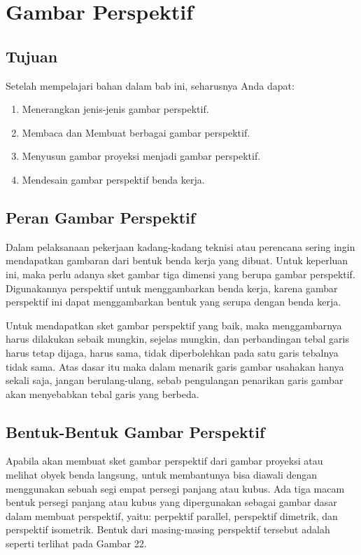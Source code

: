 \documentclass[11pt]{simart} %
\begin{document}
\section{Gambar Perspektif}

\subsection*{Tujuan}
Setelah mempelajari bahan dalam bab ini, seharusnya Anda dapat:
\begin{enumerate}
	\item Menerangkan jenis-jenis gambar perspektif.
	\item Membaca dan Membuat berbagai gambar perspektif.
	\item Menyusun gambar proyeksi menjadi gambar perspektif.
	\item Mendesain gambar perspektif benda kerja.
\end{enumerate}

\subsection{Peran Gambar Perspektif}
Dalam pelaksanaan pekerjaan kadang-kadang teknisi atau perencana sering ingin mendapatkan gambaran dari bentuk benda kerja yang dibuat. Untuk keperluan ini, maka perlu adanya sket gambar tiga dimensi yang berupa gambar perspektif. Digunakannya perspektif untuk menggambarkan benda kerja, karena gambar perspektif ini dapat menggambarkan bentuk yang serupa dengan benda kerja.

Untuk mendapatkan sket gambar perspektif yang baik, maka menggambarnya harus dilakukan sebaik mungkin, sejelas mungkin, dan perbandingan tebal garis harus tetap dijaga, harus sama, tidak diperbolehkan pada satu garis tebalnya tidak sama. Atas dasar itu maka dalam menarik garis gambar usahakan hanya sekali saja, jangan berulang-ulang, sebab pengulangan penarikan garis gambar akan menyebabkan tebal garis yang berbeda.

\subsection{Bentuk-Bentuk Gambar Perspektif}
Apabila akan membuat sket gambar perspektif dari gambar proyeksi atau melihat obyek benda langsung, untuk membantunya bisa diawali dengan menggunakan sebuah segi empat persegi panjang atau kubus. Ada tiga macam bentuk persegi panjang atau kubus yang dipergunakan sebagai gambar dasar dalam membuat perspektif, yaitu: perpektif parallel, perspektif dimetrik, dan perspektif isometrik. Bentuk dari masing-masing perspektif tersebut adalah seperti terlihat pada Gambar 22.
\end{document}
